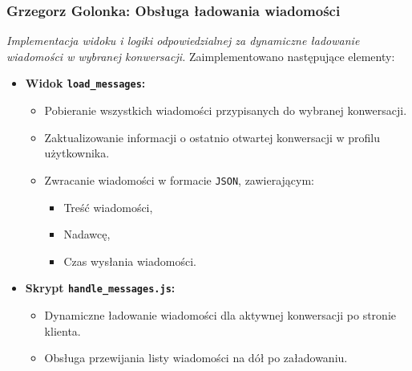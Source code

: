 \documentclass[12pt,a4paper,oneside]{article}
\theoremstyle{definition}
\numberwithin{equation}{section}
\begin{document}
\subsubsection{Grzegorz Golonka: Obsługa ładowania wiadomości}
\label{section:1.3.31}
\textit{
Implementacja widoku i logiki odpowiedzialnej za dynamiczne ładowanie wiadomości w wybranej konwersacji.
}
Zaimplementowano następujące elementy:
\begin{itemize}
    \item \textbf{Widok \texttt{load\_messages}:}
    \begin{itemize}
        \item Pobieranie wszystkich wiadomości przypisanych do wybranej konwersacji.
        \item Zaktualizowanie informacji o ostatnio otwartej konwersacji w profilu użytkownika.
        \item Zwracanie wiadomości w formacie \texttt{JSON}, zawierającym:
        \begin{itemize}
            \item Treść wiadomości,
            \item Nadawcę,
            \item Czas wysłania wiadomości.
        \end{itemize}
    \end{itemize}
    \item \textbf{Skrypt \texttt{handle\_messages.js}:}
    \begin{itemize}
        \item Dynamiczne ładowanie wiadomości dla aktywnej konwersacji po stronie klienta.
        \item Obsługa przewijania listy wiadomości na dół po załadowaniu.
    \end{itemize}
\end{itemize}
% 
% 
\end{document}
